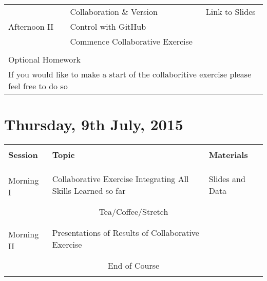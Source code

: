 \documentclass{article}[12pt]
\begin{document}
\begin{table}[h!]
\begin{tabular}{ |p{2cm}|p{4cm}|p{7cm}| }
\multirow{3}{*}{Afternoon II}  & Collaboration \& Version     & Link to Slides \\
                               & Control with GitHub          &  \\
                               & Commence Collaborative Exercise &  \\ \hline \hline
\multicolumn{3}{l}{} \\
\multicolumn{3}{l}{Optional Homework} \\
\multicolumn{3}{l}{If you would like to make a start of the collaboritive exercise please feel free to do so}
\end{tabular}
\end{table}

\clearpage
\section*{Thursday, 9th July, 2015}
\begin{table}[h!]
\begin{tabular}{ |p{2cm}|p{4cm}|p{7cm}| }
\hline
                               &                              & \\
\textbf{Session}               & \textbf{Topic}               & \textbf{Materials} \\ 
                               &                              & \\ \hline \hline
 & & \\



 & & \\
\multirow{2}{*}{Morning I }    & Collaborative Exercise Integrating All Skills Learned so far & Slides and Data \\
                              &               & \\ \hline 
\multicolumn{3}{c}{} \\ 
\multicolumn{3}{c}{Tea/Coffee/Stretch}  \\ 
\multicolumn{3}{c}{} \\ \hline
 & & \\
\multirow{2}{*}{Morning II}      & Presentations of Results of Collaborative Exercise      & \\
 & & \\ \hline
\multicolumn{3}{c}{} \\
\multicolumn{3}{c}{End of Course}  \\ 
\multicolumn{3}{c}{} \\
\end{tabular}
\end{table}
\end{document}
